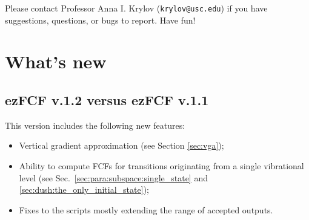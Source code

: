 \documentclass[11pt]{article}
\begin{document}
Please contact Professor Anna I. Krylov ({\tt krylov@usc.edu})
if you have suggestions, questions, or bugs to report. Have fun!  

\section*{What's new}

\subsection*{ezFCF v.1.2 versus ezFCF v.1.1}
This version includes the following new features:
\begin{itemize}
\item Vertical gradient approximation (see Section \ref{sec:vga});
\item Ability to compute FCFs for transitions originating from a single vibrational level (see Sec.~\ref{sec:para:subspace:single_state} and \ref{sec:dush:the_only_initial_state});
\item Fixes to the scripts mostly extending the range of accepted \abinitio{} outputs.
\end{itemize}  
\end{document}
